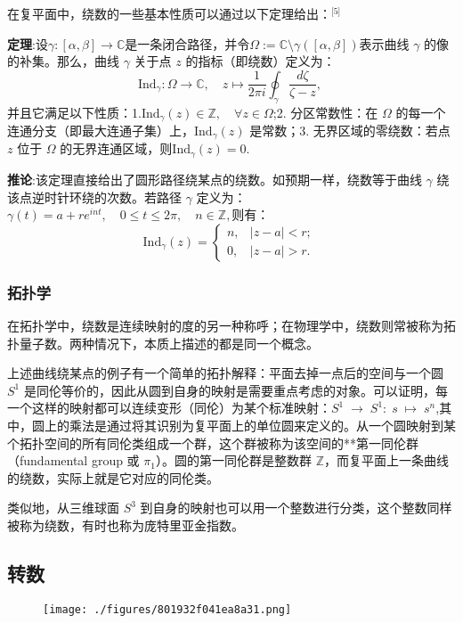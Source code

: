 在复平面中，绕数的一些基本性质可以通过以下定理给出：\(^\text{[5]}\)

\textbf{定理}:设$\gamma:[\alpha,\beta]\to\mathbb{C}$是一条闭合路径，并令$\Omega := \mathbb{C} \setminus \gamma([\alpha,\beta])$表示曲线 $\gamma$ 的像的补集。那么，曲线 $\gamma$ 关于点 $z$ 的指标（即绕数）定义为：
$$
\mathrm{Ind}_{\gamma}:\Omega\to\mathbb{C}, \quad 
z \mapsto 
\frac{1}{2\pi i}
\oint_{\gamma} 
\frac{d\zeta}{\zeta - z},~
$$
并且它满足以下性质：1.$\mathrm{Ind}_{\gamma}(z) \in \mathbb{Z}, \quad \forall z\in\Omega$;2. 分区常数性：在 $\Omega$ 的每一个连通分支（即最大连通子集）上，$\mathrm{Ind}_{\gamma}(z)$ 是常数；3. 无界区域的零绕数：若点 $z$ 位于 $\Omega$ 的无界连通区域，则$\mathrm{Ind}_{\gamma}(z) = 0$.

\textbf{推论}:该定理直接给出了圆形路径绕某点的绕数。如预期一样，绕数等于曲线 $\gamma$ 绕该点逆时针环绕的次数。若路径 $\gamma$ 定义为：$\gamma(t) = a + r e^{int}, \quad 0 \leq t \leq 2\pi, \quad n \in \mathbb{Z},$则有：
$$
\mathrm{Ind}_{\gamma}(z) =
\begin{cases}
n, & |z-a|<r;\\[6pt]
0, & |z-a|>r.
\end{cases}~
$$
\subsubsection{拓扑学}
在拓扑学中，绕数是连续映射的度的另一种称呼；在物理学中，绕数则常被称为拓扑量子数。两种情况下，本质上描述的都是同一个概念。

上述曲线绕某点的例子有一个简单的拓扑解释：平面去掉一点后的空间与一个圆 $S^1$ 是同伦等价的，因此从圆到自身的映射是需要重点考虑的对象。可以证明，每一个这样的映射都可以连续变形（同伦）为某个标准映射：$S^1 \;\to\; S^1: \; s \;\mapsto\; s^n$,其中，圆上的乘法是通过将其识别为复平面上的单位圆来定义的。从一个圆映射到某个拓扑空间的所有同伦类组成一个群，这个群被称为该空间的**第一同伦群（fundamental group 或 $\pi_1$）。圆的第一同伦群是整数群 $\mathbb{Z}$，而复平面上一条曲线的绕数，实际上就是它对应的同伦类。

类似地，从三维球面 $S^3$ 到自身的映射也可以用一个整数进行分类，这个整数同样被称为绕数，有时也称为庞特里亚金指数。
\subsection{转数}
\begin{figure}[ht]
\centering
\texttt{[image: ./figures/801932f041ea8a31.png]}
\caption{} \label{fig_JRS_3}
\end{figure}